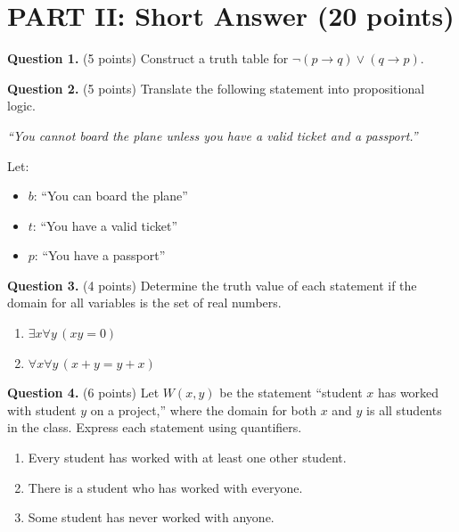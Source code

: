 \documentclass[11pt,a4paper]{article}
\begin{document}
\section*{PART II: Short Answer (20 points)}

\textbf{Question 1.} (5 points) Construct a truth table for $\neg(p \to q) \lor (q \to p)$.

\vspace{80pt}

\textbf{Question 2.} (5 points) Translate the following statement into propositional logic.

\textit{``You cannot board the plane unless you have a valid ticket and a passport.''}

Let:
\begin{itemize}[noitemsep]
    \item $b$: ``You can board the plane''
    \item $t$: ``You have a valid ticket''
    \item $p$: ``You have a passport''
\end{itemize}

\vspace{60pt}

\textbf{Question 3.} (4 points) Determine the truth value of each statement if the domain for all variables is the set of real numbers.

\begin{enumerate}[label=(\roman*)]
    \item $\exists x \forall y\, (xy = 0)$
    
    \vspace{30pt}
    
    \item $\forall x \forall y\, (x + y = y + x)$
    
    \vspace{30pt}
\end{enumerate}

\textbf{Question 4.} (6 points) Let $W(x, y)$ be the statement ``student $x$ has worked with student $y$ on a project,'' where the domain for both $x$ and $y$ is all students in the class. Express each statement using quantifiers.

\begin{enumerate}[label=(\roman*)]
    \item Every student has worked with at least one other student.
    
    \vspace{35pt}
    
    \item There is a student who has worked with everyone.
    
    \vspace{35pt}
    
    \item Some student has never worked with anyone.
    
    \vspace{35pt}
\end{enumerate}
\end{document}
